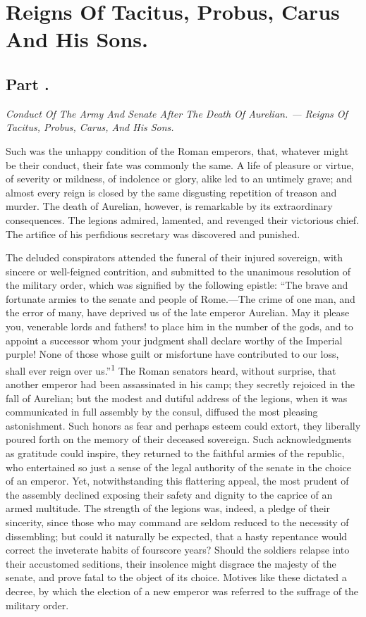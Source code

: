 \chapter{Reigns Of Tacitus, Probus, Carus And His Sons.}
\section{Part \thesection.}

\textit{Conduct Of The Army And Senate After The Death Of Aurelian.
— Reigns Of Tacitus, Probus, Carus, And His Sons.}
\vspace{\onelineskip}

Such was the unhappy condition of the Roman emperors, that,
whatever might be their conduct, their fate was commonly the
same. A life of pleasure or virtue, of severity or mildness, of
indolence or glory, alike led to an untimely grave; and almost
every reign is closed by the same disgusting repetition of
treason and murder. The death of Aurelian, however, is remarkable
by its extraordinary consequences. The legions admired, lamented,
and revenged their victorious chief. The artifice of his
perfidious secretary was discovered and punished.

The deluded conspirators attended the funeral of their injured
sovereign, with sincere or well-feigned contrition, and submitted
to the unanimous resolution of the military order, which was
signified by the following epistle: “The brave and fortunate
armies to the senate and people of Rome.—The crime of one man,
and the error of many, have deprived us of the late emperor
Aurelian. May it please you, venerable lords and fathers! to
place him in the number of the gods, and to appoint a successor
whom your judgment shall declare worthy of the Imperial purple!
None of those whose guilt or misfortune have contributed to our
loss, shall ever reign over us.”\textsuperscript{1} The Roman senators heard,
without surprise, that another emperor had been assassinated in
his camp; they secretly rejoiced in the fall of Aurelian; but the
modest and dutiful address of the legions, when it was
communicated in full assembly by the consul, diffused the most
pleasing astonishment. Such honors as fear and perhaps esteem
could extort, they liberally poured forth on the memory of their
deceased sovereign. Such acknowledgments as gratitude could
inspire, they returned to the faithful armies of the republic,
who entertained so just a sense of the legal authority of the
senate in the choice of an emperor. Yet, notwithstanding this
flattering appeal, the most prudent of the assembly declined
exposing their safety and dignity to the caprice of an armed
multitude. The strength of the legions was, indeed, a pledge of
their sincerity, since those who may command are seldom reduced
to the necessity of dissembling; but could it naturally be
expected, that a hasty repentance would correct the inveterate
habits of fourscore years? Should the soldiers relapse into their
accustomed seditions, their insolence might disgrace the majesty
of the senate, and prove fatal to the object of its choice.
Motives like these dictated a decree, by which the election of a
new emperor was referred to the suffrage of the military order.

